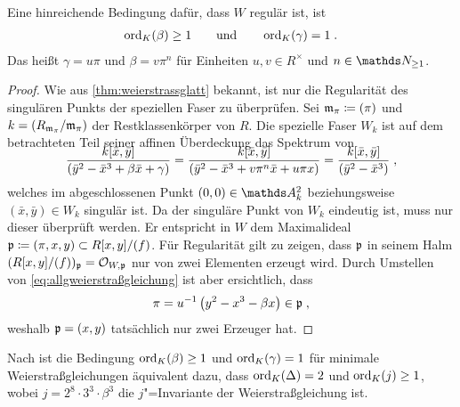 \begin{Korollar}\label{thm:c1red}
  \label{bem:bedregweierstraßmodell}
  Eine hinreichende Bedingung dafür, dass $W$ regulär ist, ist
  \begin{gather*}
    \operatorname{ord}_{K}(\beta)\geq 1
    \qquad\text{und}\qquad
    \operatorname{ord}_{K}(\gamma)=1\;.
  \end{gather*}
  Das heißt $\gamma=u\pi$ und $\beta=v\pi^n$ für Einheiten
  $u,{v\in R^\times}$ und $n\in\N_{\geq1}$.

  \begin{proof}
    Wie aus \ref{thm:weierstrassglatt} bekannt, ist nur die
    Regularität des singulären Punkts der speziellen Faser zu
    überprüfen.
    Sei $\mathfrak{m}_\pi\coloneqq(\pi)$ und $k=(R_{\mathfrak{m}_\pi}/\mathfrak{m}_\pi)$ der
    Restklassenkörper von $R$.
    Die spezielle Faser $W_k$ ist auf dem betrachteten Teil seiner
    affinen Überdeckung das Spektrum von 
    \begin{gather*}
      \SwapAboveDisplaySkip
      \dfrac{k[\bar x,\bar y]}{(\bar y^2-\bar x^3+\beta \bar x+\gamma)}
      =\dfrac{k[\bar x,\bar y]}{(\bar y^2-\bar x^3+v\pi^n \bar x+u\pi x)}
      =\dfrac{k[\bar x,\bar y]}{(\bar y^2-\bar x^3)}\;,
    \end{gather*}
    welches im abgeschlossenen Punkt $(0,0)\in\A_k^2$ beziehungsweise
    $(\bar x,\bar y)\in W_k$ singulär ist. Da der singuläre Punkt von
    $W_k$ eindeutig ist, muss nur dieser überprüft werden.
    Er entspricht in $W$ dem Maximalideal
    $\mathfrak{p}\coloneqq(\pi,x,y)\subset R[x,y]/(f)$.
    Für Regularität gilt zu zeigen, dass $\mathfrak{p}$ in seinem Halm
    $(R[x,y]/(f))_{\mathfrak{p}}=\mathcal{O}_{W,\mathfrak{p}}$ nur von zwei Elementen erzeugt wird.
    Durch Umstellen von \eqref{eq:allgweierstraßgleichung} ist aber
    ersichtlich, dass
    \begin{gather*}
      \pi = u^{-1}\left( y^2-x^3-\beta x \right)\in\mathfrak{p}\;,
    \end{gather*}
    weshalb $\mathfrak{p}=(x,y)$ tatsächlich nur zwei Erzeuger hat.
  \end{proof}
\end{Korollar}

\begin{Bemerkung}
Nach \cite[Lemma~1.5/3 und~1.5/4]{neron} ist die
Bedingung $\operatorname{ord}_{K}(\beta)\geq 1$ und $\operatorname{ord}_{K}(\gamma)=1$ für
minimale Weierstraßgleichungen äquivalent dazu,
dass $\operatorname{ord}_{K}(\Delta)=2$ und $\operatorname{ord}_{K}(j)\geq 1$,
wobei $j=2^8\cdot 3^3\cdot\beta^3$ die $j$"=Invariante der
Weierstraßgleichung ist.
\end{Bemerkung}

